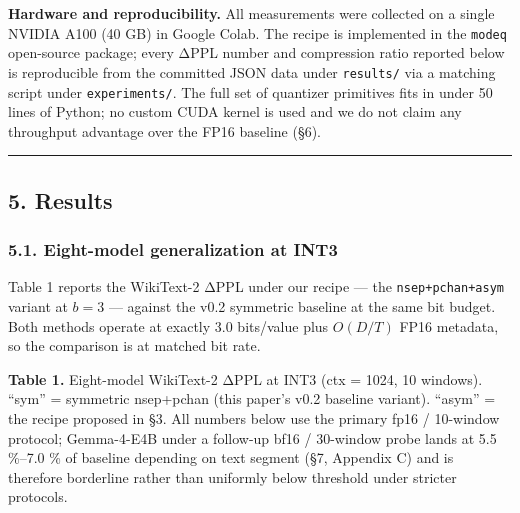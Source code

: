 \documentclass[
]{article}
\begin{document}
\textbf{Hardware and reproducibility.} All measurements were collected
on a single NVIDIA A100 (40 GB) in Google Colab. The recipe is
implemented in the \texttt{modeq} open-source package; every ΔPPL number
and compression ratio reported below is reproducible from the committed
JSON data under \texttt{results/} via a matching script under
\texttt{experiments/}. The full set of quantizer primitives fits in
under 50 lines of Python; no custom CUDA kernel is used and we do not
claim any throughput advantage over the FP16 baseline (§6).

\begin{center}\rule{0.5\linewidth}{0.5pt}\end{center}

\subsection{5. Results}\label{results}

\subsubsection{5.1. Eight-model generalization at
INT3}\label{eight-model-generalization-at-int3}

Table 1 reports the WikiText-2 ΔPPL under our recipe --- the
\texttt{nsep+pchan+asym} variant at \(b = 3\) --- against the v0.2
symmetric baseline at the same bit budget. Both methods operate at
exactly 3.0 bits/value plus \(O(D/T)\) FP16 metadata, so the comparison
is at matched bit rate.

\textbf{Table 1.} Eight-model WikiText-2 ΔPPL at INT3 (ctx = 1024, 10
windows). ``sym'' = symmetric nsep+pchan (this paper's v0.2 baseline
variant). ``asym'' = the recipe proposed in §3. All numbers below use
the primary fp16 / 10-window protocol; Gemma-4-E4B under a follow-up
bf16 / 30-window probe lands at 5.5 \%--7.0 \% of baseline depending on
text segment (§7, Appendix C) and is therefore borderline rather than
uniformly below threshold under stricter protocols.
\end{document}
